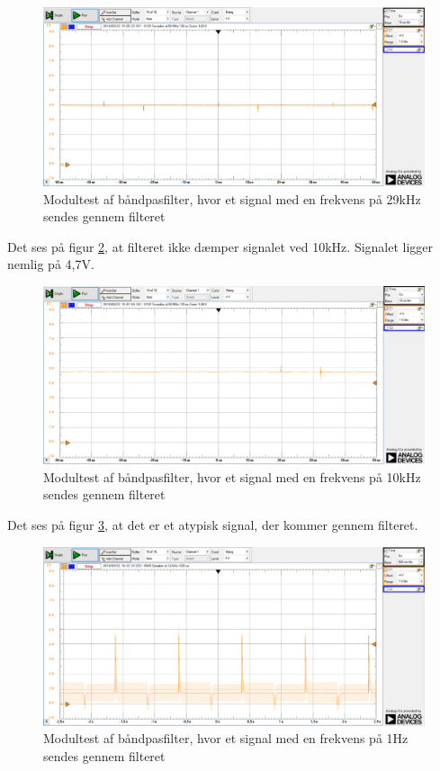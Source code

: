\begin{figure}[H]
	\centering
	\includegraphics[width=\textwidth]{Test/images/AffyringTest/BaandpasfilterTest/29kHz}
	\caption{Modultest af båndpasfilter, hvor et signal med en frekvens på 29kHz sendes gennem filteret}
	\label{fig:29kHz}
\end{figure}

\noindent Det ses på figur \ref{fig:10kHz}, at filteret ikke dæmper signalet ved 10kHz. Signalet ligger nemlig på 4,7V. 

\begin{figure}[H]
	\centering
	\includegraphics[width=\textwidth]{Test/images/AffyringTest/BaandpasfilterTest/10kHz}
	\caption{Modultest af båndpasfilter, hvor et signal med en frekvens på 10kHz sendes gennem filteret}
	\label{fig:10kHz}
\end{figure}

\noindent Det ses på figur \ref{fig:1Hz}, at det er et atypisk signal, der kommer gennem filteret. 

\begin{figure}[H]
	\centering
	\includegraphics[width=\textwidth]{Test/images/AffyringTest/BaandpasfilterTest/1Hz}
	\caption{Modultest af båndpasfilter, hvor et signal med en frekvens på 1Hz sendes gennem filteret}
	\label{fig:1Hz}
\end{figure}

